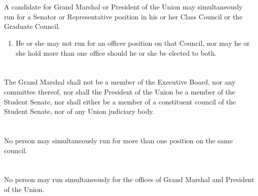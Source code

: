 \section{}
A candidate for Grand Marshal or President of the Union may simultaneously run for a Senator or
Representative position in his or her Class Council or the Graduate Council.
\begin{enumerate}
\item He or she may not run for an officer position on that Council, nor may he or she hold more than one office should he or she be elected to both.
\end{enumerate}

\section{}
The Grand Marshal shall not be a member of the Executive Board, nor any committee thereof, nor shall the President of the Union be a member of the Student Senate, nor shall either be a member of a constituent council of the Student Senate, nor of any Union judiciary body.

\section{}
No person may simultaneously run for more than one position on the same council.

\section{}
No person may run simultaneously for the offices of Grand Marshal and President of the Union. 